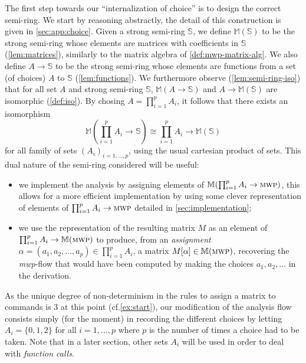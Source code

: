 \documentclass[runningheads]{llncs}
\makeatletter
\newcommand*{\cf}{cf.\@\xspace}
\makeatother
\begin{document}
The first step towards our \enquote{internalization of choice} is to design the correct semi-ring.
We start by reasoning abstractly, the detail of this construction is given in \autoref{sec:app:choice}.
Given a strong semi-ring \(\mathbb{S}\), we define \(\mathbb{M} (\mathbb{S})\) to be the strong semi-ring whose elements are matrices with coefficients in \(\mathbb{S}\) (\autoref{lem:matrices}), similarly to the matrix algebra of \autoref{def:mwp-matrix-alg}.
We also define \(A \to \mathbb{S}\) to be the strong semi-ring whose elements are functions from a set (of choices) \(A\) to \(\mathbb{S}\) (\autoref{lem:functions}).
We furthermore observe (\autoref{lem:semi-ring-iso}) %
that for all set \(A\) and strong semi-ring \(\mathbb{S} \), \(\mathbb{M} (A \to \mathbb{S} )\) and \(A \to \mathbb{M} (\mathbb{S} )\) are isomorphic (\autoref{def:iso}). By chosing \(A=\prod_{i=1}^p A_i\), it follows that there exists an isomorphism
\[
	\mathbb{M} (\prod_{i=1}^p A_i \to \mathbb{S} ) \cong \prod_{i=1}^p A_i \to \mathbb{M} (\mathbb{S} )
\]
for all family of sets \((A_i)_{i=1,\dots,p}\), using the usual cartesian product of sets.
This dual nature of the semi-ring considered will be useful:
\begin{itemize}[nolistsep,noitemsep]
	\item we implement the analysis by assigning elements of \(\mathbb{M} (\prod_{i=1}^p A_i \to \textsc{mwp} )\), this allows for a more efficient implementation by using some clever representation of elements of \(\prod_{i=1}^p A_i \to \textsc{mwp}\) detailed in \autoref{sec:implementation};
	\item we use the representation of the resulting matrix \(M\) as an element of \(\prod_{i=1}^p A_i \to \mathbb{M} (\textsc{mwp} )\) to produce, from an \emph{assignment} \(\alpha=(a_1,a_2,\dots,a_p)\in \prod_{i=1}^p A_i\), a matrix \(M[\alpha]\in \mathbb{M} (\textsc{mwp} )\), recovering the \emph{mwp}-flow that would have been computed by making the choices \(a_1,a_2,\dots\) in the derivation.
\end{itemize}

\begin{remark}
	As the unique degree of non-determinism in the rules to assign a matrix to commands is 3 at this point (\cf \autoref{ex:start}), our modification of the analysis flow consists simply (for the moment) in recording the different choices by letting \(A_i = \{0, 1, 2\}\) for all \(i=1,\dots,p\) where \(p\) is the number of times a choice had to be taken. Note that in a later section, other sets \(A_i\) will be used in order to deal with \emph{function calls}.
\end{remark}
\end{document}
